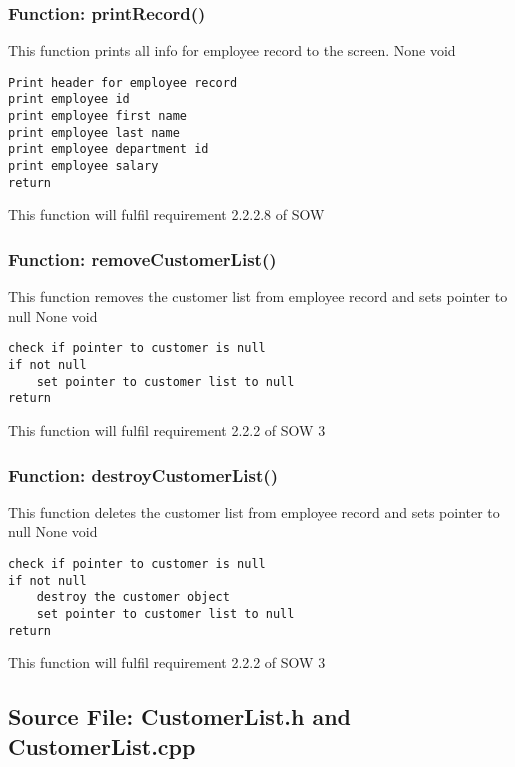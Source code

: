 \documentclass[12pt]{article}%
\newcounter{subsubsubsection}[subsubsection]
\begin{document}
\subsubsection{Function:  printRecord()}
This function prints all info for employee record to the screen.
None
void
\begin{verbatim}
Print header for employee record
print employee id
print employee first name
print employee last name
print employee department id
print employee salary
return
\end{verbatim}
This function will fulfil requirement 2.2.2.8 of SOW

\subsubsection{Function:  removeCustomerList()}
This function removes the customer list from employee record and sets pointer to null
None
void
\begin{verbatim}
check if pointer to customer is null
if not null
    set pointer to customer list to null
return
\end{verbatim}
This function will fulfil requirement 2.2.2 of SOW 3

\subsubsection{Function:  destroyCustomerList()}
This function deletes the customer list from employee record and sets pointer to null
None
void
\begin{verbatim}
check if pointer to customer is null
if not null
    destroy the customer object
    set pointer to customer list to null
return
\end{verbatim}
This function will fulfil requirement 2.2.2 of SOW 3

\subsection{Source File: CustomerList.h and CustomerList.cpp}
\end{document}
